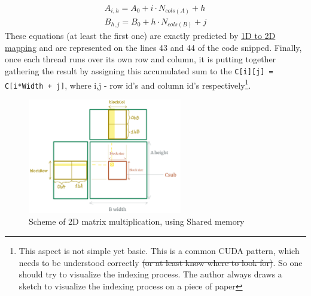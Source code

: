 \documentclass[12pt]{article}
\begin{document}
\vspace{-0.9cm}
\begin{gather*}
 A_{i, h} = A_{0} + i\cdot N_{cols(A)} + h
\\
B_{h,j} = B_{0} + h \cdot N_{cols(B)} + j
\end{gather*}
These equations (at least the first one) are exactly predicted by \hyperref[intermezzo1d2d]{1D to 2D mapping} and
are represented on the lines 43 and 44 of the code snipped. 
Finally, once each thread runs over its own row and column, it is putting together 
gathering the result by assigning this accumulated sum to the \verb|C[i][j] = C[i*Width + j]|, where i,j - row id's and column id's respectively\footnote{This 
aspect is not simple yet basic. This is a common CUDA pattern, which needs to be understood correctly 
\sout{(or at least know where to look for)}. So one should try to visualize the indexing process. The author always draws a sketch to visualize the indexing process on a piece of paper}.

\begin{figure}
   \vspace{-0.9cm}
   \begin{center}
   \includegraphics[width=0.6\textwidth]{globalmatrix.png}
   \end{center}
   \vspace{-0.5cm}
   \captionsetup{justification=raggedleft}
   \caption{Scheme of 2D matrix multiplication, using Shared memory}
   \label{global2d}
\end{figure}
\end{document}
